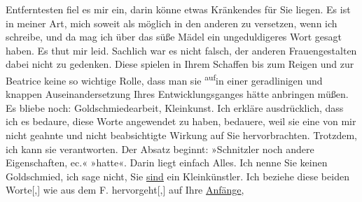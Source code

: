 \begin{ledgroupsized}[t]{13cm}
               Entferntesten fiel es mir ein, darin könne etwas Kränkendes für Sie liegen. Es ist in
               meiner Art, mich soweit als möglich in den anderen zu versetzen, wenn ich schreibe,
               und da mag ich über das süße Mädel ein ungeduldigeres Wort gesagt haben. Es thut mir
               leid. Sachlich war es nicht falsch, der anderen Frauengestalten dabei nicht zu
               gedenken. Diese spielen in Ihrem Schaffen bis zum Reigen und zur Beatrice keine so
               wichtige Rolle, dass man sie \substVorne{}\textsuperscript{auf}\substDazwischen{}in\substHinten{} einer geradlinigen und knappen Auseinandersetzung Ihres Entwicklungsganges
               hätte anbringen müßen.\pend
           \pstart
           Es bliebe noch: Goldschmiedearbeit, Kleinkunst. Ich erkläre ausdrücklich, dass ich es
               bedaure, diese Worte angewendet zu haben, bedauere, weil sie eine von mir nicht
               geahnte und nicht beabsichtigte Wirkung auf Sie hervorbrachten. Trotzdem, ich kann
               sie verantworten. Der Absatz beginnt: »Schnitzler  noch andere
                  Eigenschaften, ec.« »hatte«. Darin liegt einfach Alles. Ich nenne Sie keinen Goldschmied, ich
               sage nicht, Sie \uline{sind} ein Kleinkünstler. Ich beziehe
               diese beiden Worte{[},{]} wie aus dem F. hervorgeht{[},{]}{ } auf Ihre \uline{Anfänge},

\end{ledgroupsized}

